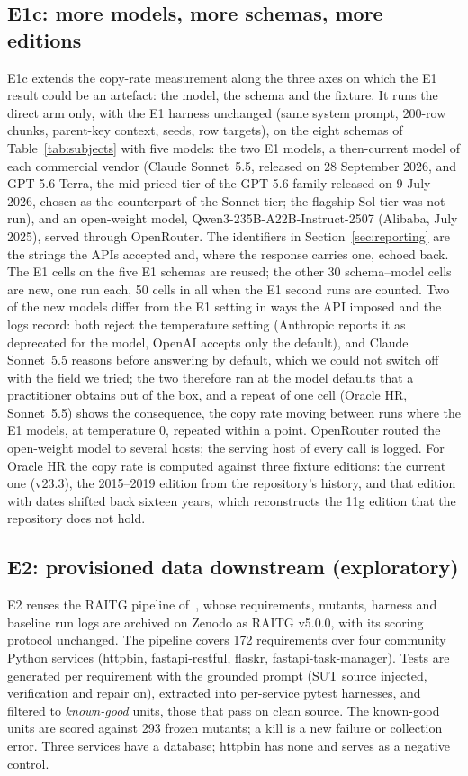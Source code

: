 \documentclass[preprint,12pt]{elsarticle}
\begin{document}
\subsection{E1c: more models, more schemas, more editions}
\label{sec:e1cdesign}
E1c extends the copy-rate measurement along the three axes on which the E1 result could be an artefact: the model, the schema and the fixture. It runs the direct arm only, with the E1 harness unchanged (same system prompt, 200-row chunks, parent-key context, seeds, row targets), on the eight schemas of Table~\ref{tab:subjects} with five models: the two E1 models, a then-current model of each commercial vendor (Claude Sonnet~5.5, released on 28 September 2026, and GPT-5.6 Terra, the mid-priced tier of the GPT-5.6 family released on 9 July 2026, chosen as the counterpart of the Sonnet tier; the flagship Sol tier was not run), and an open-weight model, Qwen3-235B-A22B-Instruct-2507 (Alibaba, July 2025), served through OpenRouter. The identifiers in Section~\ref{sec:reporting} are the strings the APIs accepted and, where the response carries one, echoed back. The E1 cells on the five E1 schemas are reused; the other 30 schema--model cells are new, one run each, 50 cells in all when the E1 second runs are counted. Two of the new models differ from the E1 setting in ways the API imposed and the logs record: both reject the temperature setting (Anthropic reports it as deprecated for the model, OpenAI accepts only the default), and Claude Sonnet~5.5 reasons before answering by default, which we could not switch off with the field we tried; the two therefore ran at the model defaults that a practitioner obtains out of the box, and a repeat of one cell (Oracle HR, Sonnet~5.5) shows the consequence, the copy rate moving between runs where the E1 models, at temperature 0, repeated within a point. OpenRouter routed the open-weight model to several hosts; the serving host of every call is logged. For Oracle HR the copy rate is computed against three fixture editions: the current one (v23.3), the 2015--2019 edition from the repository's history, and that edition with dates shifted back sixteen years, which reconstructs the 11g edition that the repository does not hold.

\subsection{E2: provisioned data downstream (exploratory)}
\label{sec:e2design}
E2 reuses the RAITG pipeline of~\cite{javvadi2026raitg}, whose requirements, mutants, harness and baseline run logs are archived on Zenodo as RAITG v5.0.0, with its scoring protocol unchanged. The pipeline covers 172 requirements over four community Python services (httpbin, fastapi-restful, flaskr, fastapi-task-manager). Tests are generated per requirement with the grounded prompt (SUT source injected, verification and repair on), extracted into per-service pytest harnesses, and filtered to \emph{known-good} units, those that pass on clean source. The known-good units are scored against 293 frozen mutants; a kill is a new failure or collection error. Three services have a database; httpbin has none and serves as a negative control.
\end{document}
